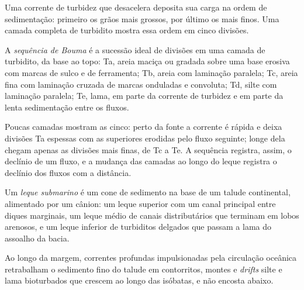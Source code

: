 Uma corrente de turbidez que desacelera deposita sua carga na ordem de sedimentação:
primeiro os grãos mais grossos, por último os mais finos. Uma camada completa de turbidito mostra
essa ordem em cinco divisões.

\begin{definition}\label{def:b3:facies-models:bouma}
A \emph{sequência de Bouma} é a sucessão ideal de
divisões em uma camada de turbidito, da base ao topo: Ta, areia maciça ou gradada sobre
uma base erosiva com marcas de sulco e de ferramenta; Tb, areia com laminação paralela; Tc,
areia fina com laminação cruzada de marcas onduladas e convoluta; Td, silte com laminação paralela;
Te, lama, em parte da corrente de turbidez e em parte da lenta sedimentação
entre os fluxos.
\end{definition}

Poucas camadas mostram as cinco: perto da fonte a corrente é rápida e deixa divisões Ta espessas
com as superiores erodidas pelo fluxo seguinte; longe dela chegam apenas
as divisões mais finas, de Tc a Te. A sequência registra, assim, o
declínio de um fluxo, e a mudança das camadas ao longo do leque registra o declínio dos
fluxos com a distância.

\begin{definition}\label{def:b3:facies-models:fan}
Um \emph{leque submarino} é um cone de sedimento na base
de um talude continental, alimentado por um cânion: um leque superior com um canal principal
entre diques marginais, um leque médio de canais distributários que terminam em lobos arenosos,
e um leque inferior de turbiditos delgados que passam a lama do assoalho da bacia.
\end{definition}

Ao longo da margem, correntes profundas impulsionadas pela circulação oceânica retrabalham o
sedimento fino do talude em contorritos, montes e \textit{drifts}
silte e lama bioturbados que crescem ao longo das isóbatas, e não
encosta abaixo.

